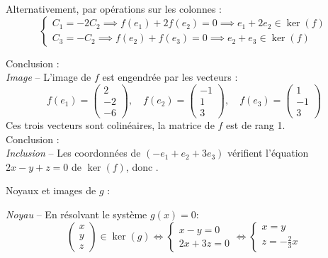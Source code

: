 \documentclass[10pt,a4paper]{article}
\begin{document}
Alternativement, par opérations sur les colonnes :
\[
\begin{cases}
C_1 = -2 C_2 \implies f(e_1) + 2 f(e_2) = 0 \implies e_1 + 2 e_2 \in \ker(f)\\
C_3 = - C_2 \implies f(e_2) + f(e_3) = 0 \implies e_2 + e_3 \in \ker(f)
\end{cases}
\]

Conclusion : \\

\textit{Image} -- L'image de \(f\) est engendrée par les vecteurs :
\[
f(e_1) = \begin{pmatrix}2 \\ -2 \\ -6\end{pmatrix}, \quad
f(e_2) = \begin{pmatrix}-1 \\ 1 \\ 3\end{pmatrix}, \quad
f(e_3) = \begin{pmatrix}1 \\ -1 \\ 3\end{pmatrix}
\]
Ces trois vecteurs sont colinéaires, la matrice de \(f\) est de rang 1.\\

Conclusion : \\

\textit{Inclusion} -- Les coordonnées de \((-e_1 + e_2 + 3 e_3)\) vérifient l'équation \(2x - y + z = 0 \) de \(\ker(f)\), donc .

\q Noyaux et images de \(g\) :

\textit{Noyau} -- En résolvant le système \(g(x) = 0\):
\[
\begin{pmatrix}x \\ y \\ z\end{pmatrix} \in \ker(g) \iff
\begin{cases}
x - y = 0 \\
2x + 3 z =0
\end{cases} \iff \begin{cases}
x = y \\
z = - \frac{2}{3}x
\end{cases}
\]
\end{document}
